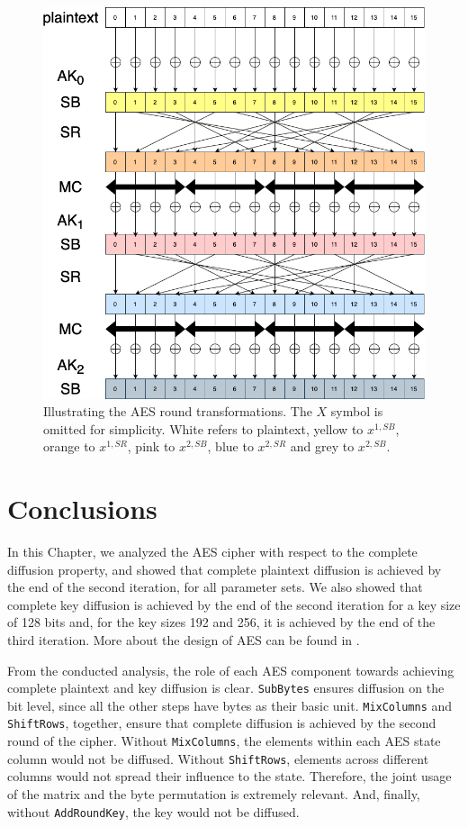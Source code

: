 \documentclass{report}
\begin{document}
\begin{figure}[H]
    \centering
    \includegraphics[scale=0.4]{AES-diffusion.drawio.png}
    \caption{Illustrating the AES round transformations. The $X$ symbol is omitted for simplicity. White refers to plaintext, yellow to $x^{1, SB}$, orange to $x^{1, SR}$, pink to $x^{2, SB}$, blue to $x^{2, SR}$ and grey to $x^{2, SB}$.}
    \label{fig:aes-diff}
\end{figure}

\section{Conclusions}
In this Chapter, we analyzed the AES cipher with respect to the complete diffusion property, and showed that complete plaintext diffusion is achieved by the end of the second iteration, for all parameter sets. We also showed that complete key diffusion is achieved by the end of the second iteration for a key size of 128 bits and, for the key sizes 192 and 256, it is achieved by the end of the third iteration. More about the design of AES can be found in \cite{Rijndael}.

From the conducted analysis, the role of each AES component towards achieving complete plaintext and key diffusion is clear. \texttt{SubBytes} ensures diffusion on the bit level, since all the other steps have bytes as their basic unit. \texttt{MixColumns} and \texttt{ShiftRows}, together, ensure that complete diffusion is achieved by the second round of the cipher. Without \texttt{MixColumns}, the elements within each AES state column would not be diffused. Without \texttt{ShiftRows}, elements across different columns would not spread their influence to the state. Therefore, the joint usage of the matrix and the byte permutation is extremely relevant. And, finally, without \texttt{AddRoundKey}, the key would not be diffused.



\end{document}
